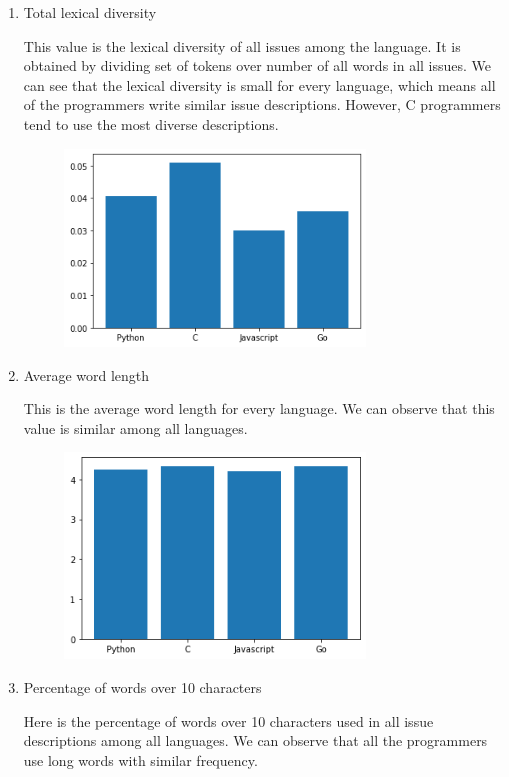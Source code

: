 \documentclass[]{article}
\begin{document}
\begin{enumerate}
    \item Total lexical diversity

          This value is the lexical diversity of all issues among the language. It is obtained by dividing set of tokens over number of all words in all issues. We can see that the lexical diversity is small for every language, which means all of the programmers write similar issue descriptions. However, C programmers tend to use the most diverse descriptions.

          \begin{figure}[H]
              \includegraphics[width=8cm]{lex_div_total.png}
              \centering
          \end{figure}

    \item Average word length

          This is the average word length for every language. We can observe that this value is similar among all languages.

          \begin{figure}[H]
              \includegraphics[width=8cm]{word_len.png}
              \centering
          \end{figure}

    \item Percentage of words over 10 characters

          Here is the percentage of words over 10 characters used in all issue descriptions among all languages. We can observe that all the programmers use long words with similar frequency.


\end{enumerate}
\end{document}
